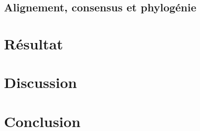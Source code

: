 \documentclass[12pt,a4paper]{article}
\begin{document}

\subsection{Alignement, consensus et phylogénie}
\section{Résultat}
\section{Discussion}
\section{Conclusion}


%
% 
%
%
%
% 
% 
\end{document}
